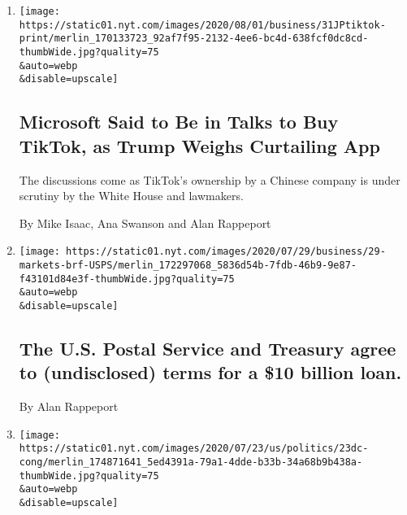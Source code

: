 \begin{enumerate}
\def\labelenumi{\arabic{enumi}.}
\item
  \href{/2020/07/31/technology/tiktok-microsoft.html}{}

  \texttt{[image: https://static01.nyt.com/images/2020/08/01/business/31JPtiktok-print/merlin\_170133723\_92af7f95-2132-4ee6-bc4d-638fcf0dc8cd-thumbWide.jpg?quality=75\\\&auto=webp\\\&disable=upscale]}

  \hypertarget{microsoft-said-to-be-in-talks-to-buy-tiktok-as-trump-weighs-curtailing-app}{%
  \subsection{Microsoft Said to Be in Talks to Buy TikTok, as Trump
  Weighs Curtailing
  App}\label{microsoft-said-to-be-in-talks-to-buy-tiktok-as-trump-weighs-curtailing-app}}

  The discussions come as TikTok's ownership by a Chinese company is
  under scrutiny by the White House and lawmakers.

  By Mike Isaac, Ana Swanson and Alan Rappeport
\item
  \href{/live/2020/07/29/business/stock-market-today-coronavirus/the-us-postal-service-and-treasury-agree-to-undisclosed-terms-for-a-10-billion-loan}{}

  \texttt{[image: https://static01.nyt.com/images/2020/07/29/business/29-markets-brf-USPS/merlin\_172297068\_5836d54b-7fdb-46b9-9e87-f43101d84e3f-thumbWide.jpg?quality=75\\\&auto=webp\\\&disable=upscale]}

  \hypertarget{the-us-postal-service-and-treasury-agree-to-undisclosed-terms-for-a-10-billion-loan}{%
  \subsection{The U.S. Postal Service and Treasury agree to
  (undisclosed) terms for a \$10 billion
  loan.}\label{the-us-postal-service-and-treasury-agree-to-undisclosed-terms-for-a-10-billion-loan}}

  By Alan Rappeport
\item
  \href{/2020/07/23/us/politics/republicans-stimulus-coronavirus.html}{}

  \texttt{[image: https://static01.nyt.com/images/2020/07/23/us/politics/23dc-cong/merlin\_174871641\_5ed4391a-79a1-4dde-b33b-34a68b9b438a-thumbWide.jpg?quality=75\\\&auto=webp\\\&disable=upscale]}

  \hypertarget{republican-stimulus-talks-stall-over-differences-on-unemployment}{%
}
\end{enumerate}
